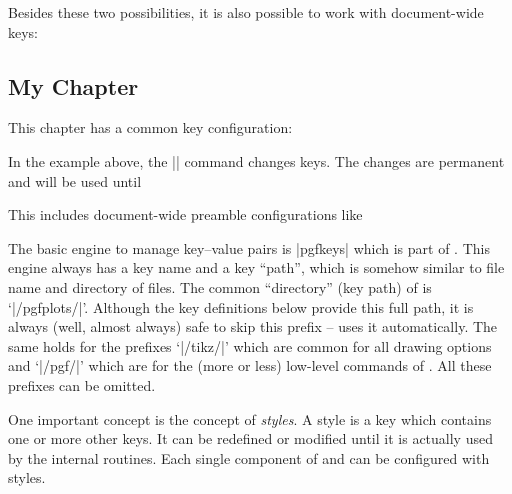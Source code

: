 Besides these two possibilities, it is also possible to work with document-wide
keys:
%
\begin{codeexample}
\chapter{My Chapter}
\pgfplotsset{
    key=value,
    key2=value2,
}
This chapter has a common key configuration:
\end{codeexample}
%
\noindent In the example above, the |\pgfplotsset| command changes keys. The
changes are permanent and will be used until
%
\begin{itemize}
    \item you redefine them or
    \item the current environment (like |\end{figure}|) is ended or
    \item \TeX{} encounters a closing brace `|}|'.
\end{itemize}
%
This includes document-wide preamble configurations like
%

The basic engine to manage key--value pairs is |pgfkeys| which is part of
\pgfname{}. This engine always has a key name and a key ``path'', which is
somehow similar to file name and directory of files. The common ``directory''
(key path) of \PGFPlots{} is `|/pgfplots/|'. Although the key definitions below
provide this full path, it is always (well, almost always) safe to skip this
prefix -- \PGFPlots{} uses it automatically. The same holds for the prefixes
`|/tikz/|' which are common for all \Tikz{} drawing options and `|/pgf/|' which
are for the (more or less) low-level commands of \pgfname{}. All these prefixes
can be omitted.

One important concept is the concept of \emph{styles}. A style is a key which
contains one or more other keys. It can be redefined or modified until it is
actually used by the internal routines. Each single component of \Tikz{} and
\PGFPlots{} can be configured with styles.

